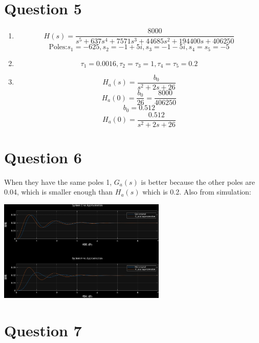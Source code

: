 \documentclass[12pt]{article}
\begin{document}
\section*{Question 5}
    \begin{enumerate}[label=(\alph*)]
        \item \[H(s) = \frac{8000}{s^5 + 637s^4 + 7571s^3 + 44685s^2 + 194400s +
            406250}\]
        \[\text{Poles:} s_1 = -625, s_2 = -1+5i, s_3 = -1-5i, s_4 = s_5 = -5\]

        \item \[\tau_1 = 0.0016, \tau_2 = \tau_3 = 1, \tau_4 = \tau_5 = 0.2\]

        \item \[H_a(s) = \frac{b_0}{s^2+2s+26}\]
        \[H_a(0) = \frac{b_0}{26} = \frac{8000}{406250}\]
        \[b_0 = 0.512\]
        \[H_a(0) = \frac{0.512}{s^2+2s+26}\]

    \end{enumerate}

\section*{Question 6}
    When they have the same poles 1, $G_a(s)$ is better because the other poles 
        are 0.04, which is smaller enough than $H_a(s)$ which is 0.2.
    Also from simulation:
    \begin{center}
        \includegraphics[width=0.6\textwidth]{Q6.png}
    \end{center}

\section*{Question 7}
\end{document}

